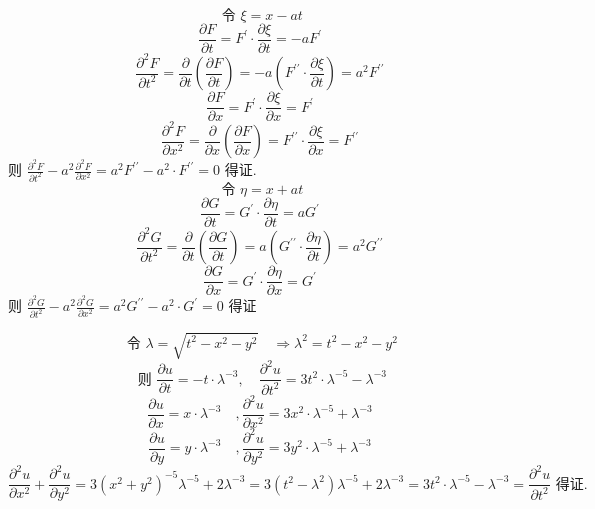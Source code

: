 \begin{questions}
 

\begin{solution}
  $$\text { 令 } \xi=x-a t$$
$$\frac{\partial F}{\partial t}=F^{\prime} \cdot \frac{\partial \xi}{\partial t}  =-a F^{\prime} $$
$$\frac{\partial^{2} F}{\partial t^{2}}=\frac{\partial}{\partial t}\left(\frac{\partial F}{\partial t}\right)  =-a\left(F^{\prime \prime} \cdot \frac{\partial \xi}{\partial t}\right)=a^2F^{\prime \prime}$$
$$\frac{\partial F}{\partial x}=F^{\prime} \cdot \frac{\partial \xi}{\partial x}=F^{\prime} $$	
$$\frac{\partial^{2} F}{\partial x^{2}}=\frac{\partial}{\partial x}\left(\frac{\partial F}{\partial x}\right)=F^{\prime \prime} \cdot \frac{\partial \xi}{\partial x}=F^{\prime \prime}$$
则 $ \frac{\partial^{2} F}{\partial t^{2}}-a^{2} \frac{\partial^{2} F}{\partial x^{2}}=a^{2} F^{\prime \prime}-a^{2} \cdot F^{\prime \prime}=0 $ 得证.
$$
 \text { 令 } \eta=x+a t
$$
$$
\frac{\partial G}{\partial t}=G^{\prime} \cdot \frac{\partial \eta }{\partial t}=a G^{\prime}
$$
$$
\frac{\partial^{2} G}{\partial t^{2}}=\frac{\partial}{\partial t}\left(\frac{\partial G}{\partial t}\right)=a\left(G^{\prime \prime} \cdot \frac{\partial \eta}{\partial t}\right)=a^{2} G^{\prime \prime}$$
$$\frac{\partial G}{\partial x}=G^{\prime} \cdot \frac{\partial \eta}{\partial x}=G^{\prime}$$
则 $ \frac{\partial^{2} G}{\partial t^{2}}-a^{2} \frac{\partial^{2} G}{\partial x^{2}}=a^{2} G^{\prime \prime}-a^2\cdot G^{\prime}=0 $ 得证
\end{solution}
\begin{solution}
$$\text { 令 } \lambda=\sqrt{t^{2}-x^{2}-y^{2}} \quad\Rightarrow \lambda^{2}=t^{2}-x^{2}-y^{2}$$
$$\text { 则 } \frac{\partial u}{\partial t}=-t \cdot \lambda^{-3} ,\quad \frac{\partial^{2} u}{\partial t^{2}}=3 t^{2} \cdot \lambda^{-5}-\lambda^{-3}$$
$$\frac{\partial u}{\partial x}=x \cdot \lambda^{-3} \quad, \frac{\partial^{2} u}{\partial x^{2}}=3 x^{2} \cdot \lambda^{-5}+\lambda^{-3} $$
$$\frac{\partial u}{\partial y}=y \cdot \lambda^{-3} \quad, \frac{\partial^{2} u}{\partial y^{2}}=3 y^{2} \cdot \lambda^{-5}+\lambda^{-3}$$
$$ \frac{\partial^{2} u}{\partial x^{2}}+\frac{\partial^{2} u}{\partial y^{2}}=3\left(x^{2}+y^{2}\right)^{-5} \lambda^{-5}+2 \lambda^{-3} 
=3\left(t^{2}-\lambda^{2}\right) \lambda^{-5}+2 \lambda^{-3}
=3 t^{2} \cdot \lambda^{-5}-\lambda^{-3}=\frac{\partial^{2} u}{\partial t^{2}} \text { 得证. } $$
\end{solution}
\end{questions}
